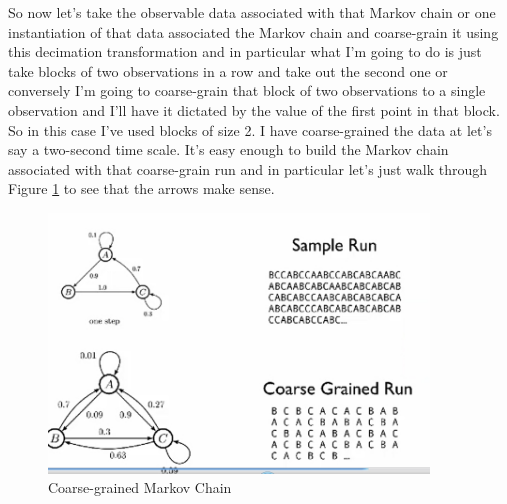 \documentclass[]{article}
\begin{document}
So now let's take the observable data
associated with that Markov chain or one
instantiation of that data associated
the Markov chain and coarse-grain it
using this decimation transformation and
in particular what I'm going to do is
just take blocks of two observations in
a row and take out the second one or
conversely I'm going to coarse-grain
that block of two observations to a
single observation and I'll have it
dictated by the value of the first point
in that block. So in this case I've used
blocks of size 2. I have coarse-grained the
data at let's say a two-second time
scale. It's easy enough to build the
Markov chain associated with that
coarse-grain run and in particular let's just
walk through Figure \ref{fig:markov2} to
see that the arrows make sense.

\begin{figure}[H]
	\caption{Coarse-grained Markov Chain}\label{fig:markov2}
	\includegraphics[width=0.9\textwidth]{markov2}
\end{figure}
\end{document}
